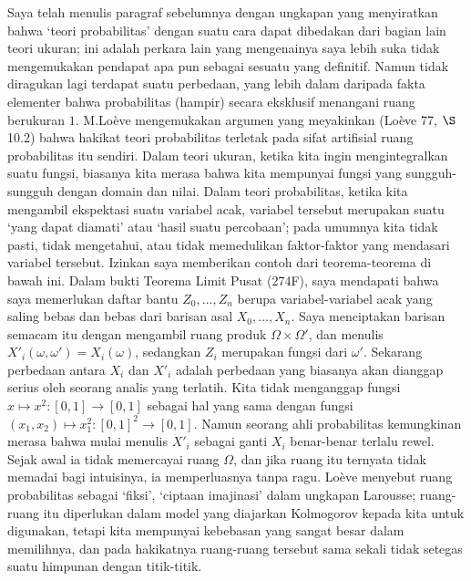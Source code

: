 Saya telah menulis paragraf sebelumnya dengan ungkapan yang menyiratkan bahwa
`teori probabilitas' dengan suatu cara dapat dibedakan dari bagian lain teori
ukuran; ini adalah perkara lain yang mengenainya saya lebih suka tidak
mengemukakan pendapat apa pun sebagai sesuatu yang definitif. Namun tidak
diragukan lagi terdapat suatu perbedaan, yang lebih dalam daripada fakta
elementer bahwa probabilitas (hampir) secara eksklusif menangani ruang
berukuran $1$.
M.Lo\`eve mengemukakan argumen yang meyakinkan ({\smc Lo\`eve 77}, $\S$10.2)
bahwa hakikat teori probabilitas terletak pada sifat artifisial ruang
probabilitas itu sendiri. Dalam teori ukuran, ketika kita ingin
mengintegralkan suatu fungsi, biasanya kita merasa bahwa kita mempunyai fungsi
yang sungguh-sungguh dengan domain dan nilai. Dalam teori probabilitas, ketika
kita mengambil ekspektasi suatu variabel acak, variabel tersebut merupakan suatu
`yang dapat diamati' atau `hasil suatu percobaan'; pada umumnya kita tidak
pasti, tidak mengetahui, atau tidak memedulikan faktor-faktor yang mendasari
variabel tersebut. Izinkan saya memberikan contoh dari teorema-teorema di bawah
ini. Dalam bukti Teorema Limit Pusat (274F), saya mendapati bahwa saya
memerlukan daftar bantu $Z_0,\ldots,Z_n$ berupa variabel-variabel acak yang saling
bebas dan bebas dari barisan asal $X_0,\ldots,X_n$. Saya menciptakan
barisan semacam itu dengan mengambil ruang produk $\Omega\times\Omega'$, dan
menulis $X'_i(\omega,\omega')=X_i(\omega)$, sedangkan $Z_i$ merupakan fungsi
dari $\omega'$. Sekarang perbedaan antara $X_i$ dan $X'_i$ adalah perbedaan
yang biasanya akan dianggap serius oleh seorang analis yang terlatih. Kita
tidak menganggap fungsi $x\mapsto x^2:[0,1]\to[0,1]$ sebagai hal yang sama
dengan fungsi $(x_1,x_2)\mapsto x_1^2:[0,1]^2\to[0,1]$. Namun seorang ahli
probabilitas kemungkinan merasa bahwa mulai menulis $X'_i$ sebagai ganti
$X_i$ benar-benar terlalu rewel. Sejak awal ia tidak memercayai ruang
$\Omega$, dan jika ruang itu ternyata tidak memadai bagi intuisinya, ia
memperluasnya tanpa ragu. Lo\`eve menyebut ruang probabilitas sebagai `fiksi',
`ciptaan imajinasi' dalam ungkapan Larousse; ruang-ruang itu diperlukan dalam
model yang diajarkan Kolmogorov kepada kita untuk digunakan, tetapi kita
mempunyai kebebasan yang sangat besar dalam memilihnya, dan pada hakikatnya
ruang-ruang tersebut sama sekali tidak setegas suatu himpunan dengan
titik-titik. 
 

